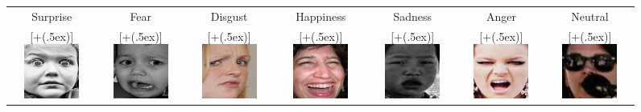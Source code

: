 \documentclass[12pt]{article}
\newcommand*{\addheight}[2][.5ex]{%
  \raisebox{0pt}[\dimexpr\height+(#1)\relax]{#2}%
}
\begin{document}
\begin{figure} [h!]
    \centering
\begin{tabular}{|c|c|c|c|c|c|c|}
      \hline
      \small Surprise & Fear & Disgust & Happiness & Sadness & Anger & Neutral \\
      \addheight{\includegraphics[width=18mm]{imgs/train_00006_aligned-1.jpg}} &
      \addheight{\includegraphics[width=18mm]{imgs/train_00027_aligned-2.jpg}} &
      \addheight{\includegraphics[width=18mm]{imgs/train_00031_aligned-3.jpg}} &
      \addheight{\includegraphics[width=18mm]{imgs/train_00016_aligned-4.jpg}} &
      \addheight{\includegraphics[width=18mm]{imgs/train_00005_aligned-5.jpg}} &
      \addheight{\includegraphics[width=18mm]{imgs/train_00047_aligned-6.jpg}} &
      \addheight{\includegraphics[width=18mm]{imgs/train_09757_aligned-7.jpg}} \\


\end{tabular}
\end{figure}
\end{document}
